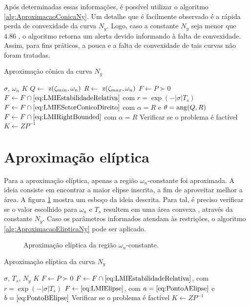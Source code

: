 Após determinadas essas informações, é possível utilizar o algoritmo \ref{alg:AproximacaoConicaNy}. Um detalhe que é facilmente observado é a rápida perda de convexidade da curva $N_y$. Logo, caso a constante $N_y$ seja menor que $4.86$ \cite{CHIQUETO2021}, o algoritmo retorna um alerta devido informando à falta de convexidade. Assim, para fins práticos, a pouca e a falta de convexidade de tais curvas não foram tratadas.
\begin{algorithm}[hb!]
  \caption{Aproximação cônica da curva $N_y$}\label{alg:AproximacaoConicaNy}
  \begin{algorithmic}[1]
    \Require $\sigma$, $\omega_n$
    \Ensure $K$
    \State $Q \gets $ $\operatorname{\mathrm{z}}(\zeta_{min},\omega_n)$
    \State $R \gets $ $\operatorname{\mathrm{z}}(\zeta_{max},\omega_n)$
    \State $F \gets P \succ 0$
    \State $F \gets F \cap \eqref{eq:LMIEstabilidadeRelativa}$ com $r = \exp{\left(-|\sigma|T_s\right)}$ 
    \State $F \gets F \cap \eqref{eq:LMIESetorConicoDireito}$ com $\alpha = R$ e $\theta = \operatorname{ang}(Q,R)$ 
    \State $F \gets F \cap \eqref{eq:LMIRightBounded}$ com $\alpha = R$ 
    \State Verificar se o problema é factível
    \State $K \gets ZP^{-1}$
  \end{algorithmic}
\end{algorithm}

\section{Aproximação elíptica}
Para a aproximação elíptica, apenas a região $\omega_n$-constante foi aproximada. A ideia consiste em encontrar a maior elipse inscrita, a fim de aproveitar melhor a área. A figura \ref{fig:AproximacaoEliptica} mostra um esboço da ideia descrita. Para tal, é preciso verificar se o valor escolhido para $\omega_n$ e $T_s$ resultem em uma área convexa \cite{CHIQUETO2021}, através da constante $N_y$. Caso os parâmetros informados atendam às restrições, o algoritmo \ref{alg:AproximacaoElipticaNy} pode ser aplicado.
\begin{figure}[!ht]
  \centering
  
  \caption{Aproximação elíptica da região $\omega_n$-constante.}
  \label{fig:AproximacaoEliptica}
\end{figure}

\begin{algorithm}[hb!]
  \caption{Aproximação elíptica da curva $N_y$}\label{alg:AproximacaoElipticaNy}
  \begin{algorithmic}[1]
    \Require $\sigma$, $T_s$, $N_y$
    \Ensure $K$
    \State $F \gets P \succ 0$
    \State $F \gets F \cap \eqref{eq:LMIEstabilidadeRelativa}$, com $r = \exp{\left(-|\sigma|T_s\right)}$ 
    \State $F \gets \eqref{eq:LMIElipse}$, com $a = \eqref{eq:PontoAElipse}$ e $b = \eqref{eq:PontoBElipse}$ 
    \State Verificar se o problema é factível
    \State $K \gets ZP^{-1}$
  \end{algorithmic}
\end{algorithm}

